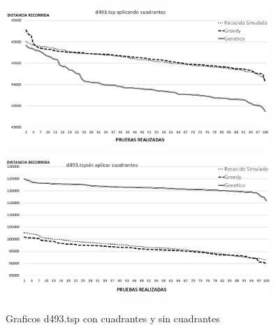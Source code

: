  \begin{figure}[hbtp]
    \centering
        \includegraphics[width=0.9\textwidth]{PruebasResultados/Experimentos_Graficos_Con/d493.png}
        \includegraphics[width=0.9\textwidth]{PruebasResultados/Experimentos_Graficos_Sin/d493.png}
        \caption{Graficos d493.tsp con cuadrantes y sin cuadrantes}
        \label{fig:d493_grafica.png}
\end{figure}
\newpage


